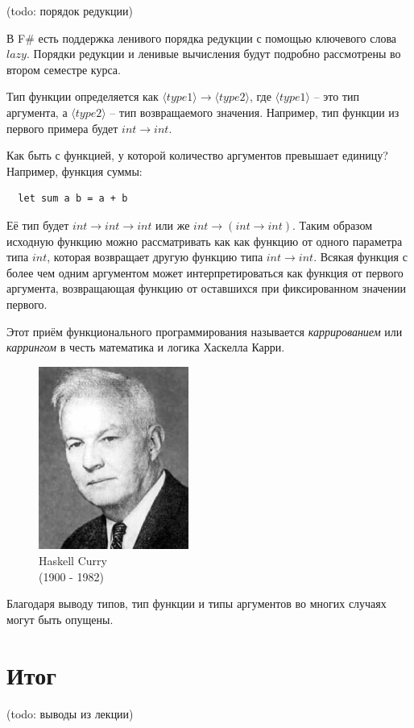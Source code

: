 \documentclass[a4paper,11pt]{article}
\begin{document}
(todo: порядок редукции)

В F\# есть поддержка ленивого порядка редукции с помощью ключевого слова $lazy$.
Порядки редукции и ленивые вычисления будут подробно рассмотрены во втором
семестре курса.

Тип функции определяется как $\langle type1 \rangle \rightarrow \langle type2 
\rangle$, где $\langle type1 \rangle$ -- это тип аргумента, а $\langle type2
\rangle$ -- тип возвращаемого значения. Например, тип функции из первого примера
будет $int \rightarrow int$.

Как быть с функцией, у которой количество аргументов превышает единицу? 
Например, функция суммы:
\begin{lstlisting}
  let sum a b = a + b
\end{lstlisting}

Её тип будет $int \rightarrow int \rightarrow int$ или же $int \rightarrow (int 
\rightarrow int)$. Таким образом исходную функцию можно рассматривать как
как функцию от одного параметра типа $int$, которая возвращает другую функцию
типа $int \rightarrow int$. Всякая функция с более чем одним аргументом 
может интерпретироваться как функция от первого аргумента, возвращающая функцию
от оставшихся при фиксированном значении первого. 

Этот приём функционального программирования называется \emph{каррированием} или
\emph{каррингом} в честь математика и логика Хаскелла Карри.

\begin{figure}[h]
    \begin{center}
        \includegraphics[height=60mm]{lecture1/curry.eps}
        \caption{Haskell Curry\\(1900 - 1982)}
    \end{center}
\end{figure}

Благодаря выводу типов, тип функции и типы аргументов во многих случаях могут
быть опущены.

\section*{Итог}

(todo: выводы из лекции)

\nocite{*}


\end{document}
